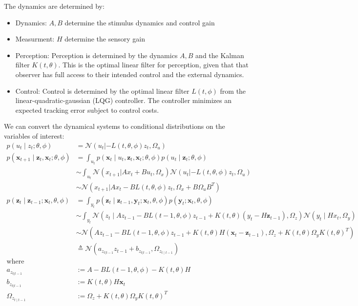 \documentclass[11pt, reqno]{article}
\numberwithin{equation}{section}
\begin{document}
\noindent The dynamics are determined by:
\begin{itemize}
\item Dynamics: $A,B$ determine the stimulus dynamics and control gain
\item Measurment: $H$ determine the sensory gain
\item Perception: Perception is determined by the dynamics $A,B$ and the Kalman filter $K(t,\theta)$. This is the optimal linear filter for perception, given that that observer has full access to their intended control and the external dynamics. 
\item Control: Control is determined by the optimal linear filter $L(t,\phi)$ from the linear-quadratic-gaussian (LQG) controller. The controller minimizes an expected tracking error subject to control costs. 
\end{itemize}

\noindent We can convert the dynamical systems to conditional distributions on the variables of interest:
\begin{align*}
p(u_t \mid z_t; \theta, \phi) &= \mathcal{N}(u_t |- L(t,\theta, \phi) z_{t}, \Omega_{u}) \\
p(\bm{x}_{t+1} \mid \bm{z}_{t}, \bm{x}_{t};\theta, \phi) &=\int_{u_t} p(\bm{x}_t \mid u_t, \bm{z}_{t},  \bm{x}_{t}; \theta, \phi)  p(u_t \mid \bm{z}_{t}; \theta, \phi) \\
&\sim \int_{u_t} \mathcal{N}(x_{t+1}| Ax_{t} + Bu_t, \Omega_x ) \mathcal{N}(u_t |- L(t,\theta, \phi) z_{t}, \Omega_{u})\\
&\sim\mathcal{N}(x_{t+1}| Ax_{t} - B L(t,\theta, \phi) z_{t}, \Omega_x + B \Omega_u B^T)\\
p(\bm{z}_t \mid \bm{z}_{t-1}; \bm{x}_t, \theta, \phi) &= \int_{y_t} p(\bm{z}_t \mid \bm{z}_{t-1}, \bm{y}_t;\bm{x}_t, \theta, \phi) p(\bm{y}_t ; \bm{x}_t, \theta, \phi)\\
&\sim  \int_{y_t} \mathcal{N}\left(z_t \mid A z_{t-1} - BL(t-1,\theta, \phi)z_{t-1} + K(t,\theta)(y_t - H \bm{z}_{t-1}) , \Omega_z \right) \mathcal{N}(y_t \mid Hx_t,  \Omega_y ) \\ 
&\sim \mathcal{N}\left(A z_{t-1} - BL(t-1,\theta, \phi)z_{t-1} + K(t,\theta) H(\bm{x}_t - \bm{z}_{t-1}) , \Omega_z + K(t,\theta) \Omega_y K(t,\theta)^T  \right) \\ 
&\triangleq \mathcal{N}\left( a_{z_{t|t-1}}z_{t-1} + b_{z_{t|t-1}}, \Omega_{z_{t\mid t-1}}  \right) \\
\text{where} & \\
a_{z_{t|t-1}} &:= A - BL(t-1,\theta, \phi) - K(t,\theta)H \\
b_{z_{t|t-1}} &:=K(t,\theta) H\bm{x}_t \\
\Omega_{z_{t\mid t-1}} &:= \Omega_z + K(t,\theta) \Omega_y K(t,\theta)^T 
\end{align*}
\end{document}
